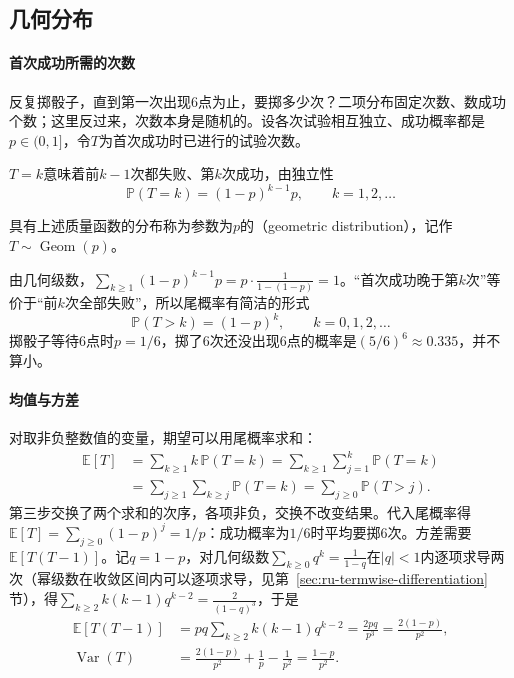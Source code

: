 \subsection{几何分布}
\label{sec:prob-geometric}

\paragraph{首次成功所需的次数}
反复掷骰子，直到第一次出现$6$点为止，要掷多少次？二项分布固定次数、数成功个数；这里反过来，次数本身是随机的。设各次试验相互独立、成功概率都是$p\in(0,1]$，令$T$为首次成功时已进行的试验次数。

$T=k$意味着前$k-1$次都失败、第$k$次成功，由独立性
\[
  \mathbb{P}(T=k)=(1-p)^{k-1}p,\qquad k=1,2,\dots
\]

\begin{definition}[几何分布]
\label{def:prob-geometric}
具有上述质量函数的分布称为参数为$p$的（geometric distribution），记作$T\sim\operatorname{Geom}(p)$。
\end{definition}

由几何级数，$\sum_{k\geq1}(1-p)^{k-1}p=p\cdot\frac{1}{1-(1-p)}=1$。“首次成功晚于第$k$次”等价于“前$k$次全部失败”，所以尾概率有简洁的形式
\[
  \mathbb{P}(T>k)=(1-p)^k,\qquad k=0,1,2,\dots
\]
掷骰子等待$6$点时$p=1/6$，掷了$6$次还没出现$6$点的概率是$(5/6)^6\approx0.335$，并不算小。

\paragraph{均值与方差}
对取非负整数值的变量，期望可以用尾概率求和：
\[
  \begin{aligned}
  \mathbb{E}[T]&=\sum_{k\geq1}k\,\mathbb{P}(T=k)=\sum_{k\geq1}\sum_{j=1}^{k}\mathbb{P}(T=k)\\
  &=\sum_{j\geq1}\sum_{k\geq j}\mathbb{P}(T=k)=\sum_{j\geq0}\mathbb{P}(T>j).
  \end{aligned}
\]
第三步交换了两个求和的次序，各项非负，交换不改变结果。代入尾概率得$\mathbb{E}[T]=\sum_{j\geq0}(1-p)^j=1/p$：成功概率为$1/6$时平均要掷$6$次。方差需要$\mathbb{E}[T(T-1)]$。记$q=1-p$，对几何级数$\sum_{k\geq0}q^k=\frac{1}{1-q}$在$|q|<1$内逐项求导两次（幂级数在收敛区间内可以逐项求导，见第~\ref{sec:ru-termwise-differentiation}节），得$\sum_{k\geq2}k(k-1)q^{k-2}=\frac{2}{(1-q)^3}$，于是
\[
  \begin{aligned}
  \mathbb{E}[T(T-1)]&=pq\sum_{k\geq2}k(k-1)q^{k-2}=\frac{2pq}{p^3}=\frac{2(1-p)}{p^2},\\
  \operatorname{Var}(T)&=\frac{2(1-p)}{p^2}+\frac1p-\frac1{p^2}=\frac{1-p}{p^2}.
  \end{aligned}
\]

